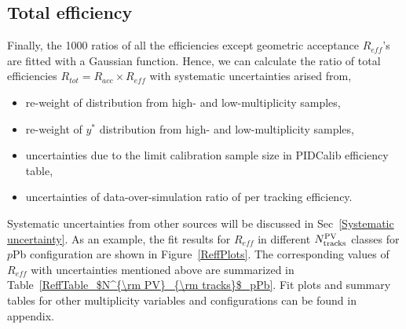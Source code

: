 \subsection{Total efficiency}
Finally, the 1000 ratios of all the efficiencies except geometric acceptance $R_{eff}$'s are fitted with a Gaussian function. Hence, we can calculate the ratio of total efficiencies $R_{tot}=R_{acc}\times R_{eff}$ with systematic uncertainties arised from,
\begin{itemize}
    \item re-weight of \pt distribution from high- and low-multiplicity samples,
    \item re-weight of $y^*$ distribution from high- and low-multiplicity samples,
    \item uncertainties due to the limit calibration sample size in PIDCalib efficiency table,
    \item uncertainties of data-over-simulation ratio of per tracking efficiency.
\end{itemize}
Systematic uncertainties from other sources will be discussed in Sec~\ref{Systematic uncertainty}. As an example, the fit results for $R_{eff}$ in different $N^{\rm PV}_{\rm tracks}$ classes for $p$Pb configuration are shown in Figure~\ref{ReffPlots}. The corresponding values of $R_{eff}$ with uncertainties mentioned above are summarized in Table~\ref{ReffTable_$N^{\rm PV}_{\rm tracks}$_pPb}. Fit plots and summary tables for other multiplicity variables and configurations can be found in appendix.
